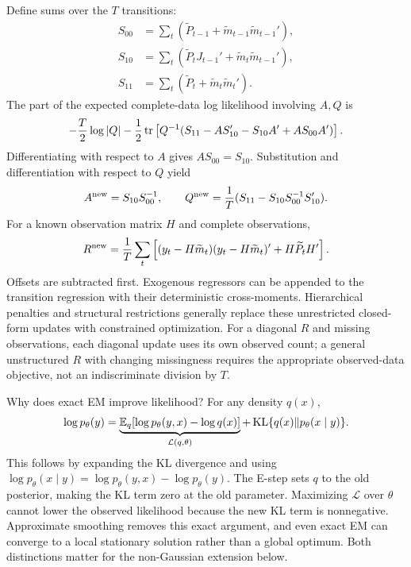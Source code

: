 Define sums over the $T$ transitions:
\begin{align}
S_{00}&=\sum_t(\widetilde P_{t-1}+\widetilde m_{t-1}\widetilde m_{t-1}'),\\
S_{10}&=\sum_t(\widetilde P_tJ_{t-1}'+\widetilde m_t\widetilde m_{t-1}'),\\
S_{11}&=\sum_t(\widetilde P_t+\widetilde m_t\widetilde m_t').
\end{align}
The part of the expected complete-data log likelihood involving $A,Q$ is
\begin{equation}
-\frac{T}{2}\log|Q|-\frac12\operatorname{tr}\left[
Q^{-1}(S_{11}-AS_{10}'-S_{10}A'+AS_{00}A')\right].
\end{equation}
Differentiating with respect to $A$ gives $AS_{00}=S_{10}$. Substitution and differentiation with respect to $Q$ yield
\begin{equation}
A^{\rm new}=S_{10}S_{00}^{-1},\qquad
Q^{\rm new}=\frac1T(S_{11}-S_{10}S_{00}^{-1}S_{10}').
\label{eq:emupdate}
\end{equation}
For a known observation matrix $H$ and complete observations,
\begin{equation}
R^{\rm new}=\frac1T\sum_t
\left[(y_t-H\widetilde m_t)(y_t-H\widetilde m_t)'
      +H\widetilde P_tH'\right].
\end{equation}
Offsets are subtracted first. Exogenous regressors can be appended to the transition regression with their deterministic cross-moments. Hierarchical penalties and structural restrictions generally replace these unrestricted closed-form updates with constrained optimization. For a diagonal $R$ and missing observations, each diagonal update uses its own observed count; a general unstructured $R$ with changing missingness requires the appropriate observed-data objective, not an indiscriminate division by $T$.

Why does exact EM improve likelihood? For any density $q(x)$,
\begin{equation}
\log p_\theta(y)
=\underbrace{\mathbb E_q[\log p_\theta(y,x)-\log q(x)]}_{\mathcal L(q,\theta)}
+\operatorname{KL}\{q(x)\Vert p_\theta(x\mid y)\}.
\label{eq:elbo}
\end{equation}
This follows by expanding the KL divergence and using
$\log p_\theta(x\mid y)=\log p_\theta(y,x)-\log p_\theta(y)$.
The E-step sets $q$ to the old posterior, making the KL term zero at the old parameter. Maximizing $\mathcal L$ over $\theta$ cannot lower the observed likelihood because the new KL term is nonnegative. Approximate smoothing removes this exact argument, and even exact EM can converge to a local stationary solution rather than a global optimum. Both distinctions matter for the non-Gaussian extension below.

